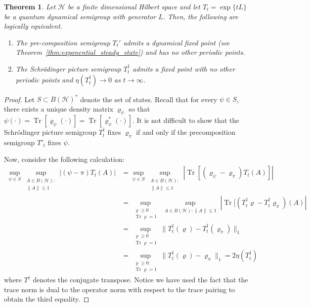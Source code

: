 \documentclass{article}
\DeclareMathOperator{\Tr}{Tr}
\newcommand{\<}{\langle}
\renewcommand{\>}{\rangle}
\numberwithin{equation}{section}
\newtheorem{thm}{Theorem}[section]
\theoremstyle{definition}
\begin{document}
\begin{thm}\label{thm:rapid_mixing}
	Let $\mathcal{H}$ be a finite dimensional Hilbert space and let $T_t = \exp\{t L\}$ be a quantum dynamical semigroup with generator $L$. Then, the following are logically equivalent. 
	\begin{enumerate}[label = (\alph*)]
		\item The pre-composition semigroup $T_t'$ admits a dynamical fixed point (see Theorem~\ref{thm:exponential_steady_state}) and has no other periodic points. 
		\item The Schr\"odinger picture semigroup $T_t^\dagger$ admits a fixed point with no other periodic points and $\eta(T^\dagger_t) \to 0$ as $t\to \infty$. 
	\end{enumerate}
\end{thm}
\begin{proof}
	Let $S\subset B(\mathcal{H})^*$ denote the set of states. Recall that for every $\psi \in S$, there exists a unique density matrix $\varrho_\psi$ so that $\psi(\cdot) = \Tr[\varrho_\psi (\cdot)]= \Tr[\varrho_\psi^*(\cdot)]$. It is not difficult to show that the Schr\"odinger picture semigroup $T^\dagger_t$ fixes $\varrho_\pi$ if and only if the precomposition semigroup $T'_t$ fixes $\psi$.


Now, consider the following calculation: \begin{align*}
	\sup_{\psi \in S} \sup_{\substack{A\in B(\mathcal{H}):\\ \|A\| \le 1}} |(\psi  - \pi)T_t(A)| & = \sup_{\psi \in S} \sup_{\substack{A\in B(\mathcal{H}):\\ \|A\| \le 1}} |\Tr[ (\varrho_\psi - \varrho_\pi) T_t(A)]| \\
	&= \sup_{\substack{\varrho \ge 0\\ \Tr \varrho =1}} \sup_{\substack{A\in B(\mathcal{H}): \|A\|\le 1}} |\Tr[ (T_t^\dagger \varrho - T^\dagger_t \varrho_\pi) (A)|\\
	&=  \sup_{\substack{\varrho \ge 0\\ \Tr \varrho =1}} \|T^\dagger_t(\varrho) - T^\dagger_t(\varrho_\pi)\|_1\\
	&= \sup_{\substack{\varrho \ge 0:\\ \Tr \varrho = 1}} \|T_t^\dagger (\varrho) - \varrho_\pi\|_1 = 2\eta(T^{\dagger}_t)
\end{align*} where $T^\dagger$ denotes the conjugate transpose. Notice we have used the fact that the trace norm is dual to the operator norm with respect to the trace pairing to obtain the third equality. 


\end{proof}
\end{document}
